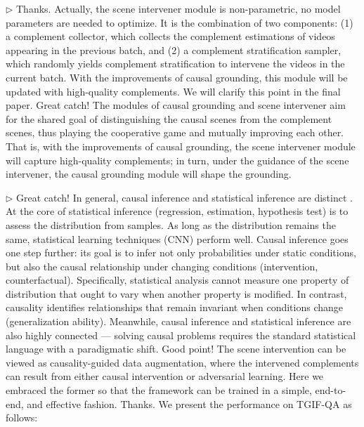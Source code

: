 \documentclass[10pt,twocolumn,letterpaper]{article}
\newcommand{\blue}[1]{{\color{blue}{#1}}}
\newcommand{\pink}[1]{{\color{magenta}{#1}}}
\begin{document}
\vspace{2pt}
\noindent
$\triangleright$\pink{Reviewer \#3.}
\blue{Q1: Optimization of the scene intervener module.}
Thanks. Actually, the scene intervener module is non-parametric, \ie no model parameters are needed to optimize. It is the combination of two components: (1) a complement collector, which collects the complement estimations of videos appearing in the previous batch, and (2) a complement stratification sampler, which randomly yields complement stratification to intervene the videos in the current batch.
With the improvements of causal grounding, this module will be updated with high-quality complements.
We will clarify this point in the final paper.
\blue{Q2: Effect of the causal grounding result on the performance.}
Great catch! The modules of causal grounding and scene intervener aim for the shared goal of distinguishing the causal scenes from the complement scenes, thus playing the cooperative game and mutually improving each other.
That is, with the improvements of causal grounding, the scene intervener module will capture high-quality complements; in turn, under the guidance of the scene intervener, the causal grounding module will shape the grounding.

\vspace{2pt}
\noindent
$\triangleright$\pink{Reviewer \#4.}
\blue{Q1: Relation \& Difference between causal look and statistical learning.}
Great catch! In general, causal inference and statistical inference are distinct \cite{pearl2009causal}.
At the core of statistical inference (\eg regression, estimation, hypothesis test) is to assess the distribution from samples. As long as the distribution remains the same, statistical learning techniques (\eg CNN) perform well.
Causal inference goes one step further: its goal is to infer not only probabilities under static conditions, but also the causal relationship under changing conditions (\eg intervention, counterfactual).
Specifically, statistical analysis cannot measure one property of distribution that ought to vary when another property is modified. In contrast, causality identifies relationships that remain invariant when conditions change (\eg generalization ability).
Meanwhile, causal inference and statistical inference are also highly connected --- solving causal problems requires the standard statistical language with a paradigmatic shift.
\blue{Q2: Relation \& Difference between intervened and adversarial scenes.}
Good point! The scene intervention can be viewed as causality-guided data augmentation, where the intervened complements can result from either causal intervention or adversarial learning.
Here we embraced the former so that the framework can be trained in a simple, end-to-end, and effective fashion.
\blue{Performance on TGIF-QA.}
Thanks. We present the performance on TGIF-QA as follows:
\vspace{-10pt}

\end{document}
